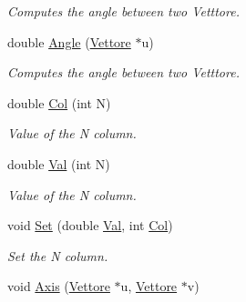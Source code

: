 \begin{DoxyCompactItemize}
\begin{DoxyCompactList}\small\item\em Computes the angle between two Vetttore. \end{DoxyCompactList}\item 
double \hyperlink{classVettore_ac72b0f82d368ace2ef8090d276a9c751}{Angle} (\hyperlink{classVettore}{Vettore} $\ast$u)\hypertarget{classVettore_ac72b0f82d368ace2ef8090d276a9c751}{}\label{classVettore_ac72b0f82d368ace2ef8090d276a9c751}

\begin{DoxyCompactList}\small\item\em Computes the angle between two Vetttore. \end{DoxyCompactList}\item 
double \hyperlink{classVettore_ad018d767a0e0b15fbc17269db64d7574}{Col} (int N)\hypertarget{classVettore_ad018d767a0e0b15fbc17269db64d7574}{}\label{classVettore_ad018d767a0e0b15fbc17269db64d7574}

\begin{DoxyCompactList}\small\item\em Value of the N column. \end{DoxyCompactList}\item 
double \hyperlink{classVettore_a8fcbd69726df0d5309a4f2d790f427fd}{Val} (int N)\hypertarget{classVettore_a8fcbd69726df0d5309a4f2d790f427fd}{}\label{classVettore_a8fcbd69726df0d5309a4f2d790f427fd}

\begin{DoxyCompactList}\small\item\em Value of the N column. \end{DoxyCompactList}\item 
void \hyperlink{classVettore_af865716b201375aaca7c880377aa2426}{Set} (double \hyperlink{classVettore_a8fcbd69726df0d5309a4f2d790f427fd}{Val}, int \hyperlink{classVettore_ad018d767a0e0b15fbc17269db64d7574}{Col})\hypertarget{classVettore_af865716b201375aaca7c880377aa2426}{}\label{classVettore_af865716b201375aaca7c880377aa2426}

\begin{DoxyCompactList}\small\item\em Set the N column. \end{DoxyCompactList}\item 
void \hyperlink{classVettore_a5a767accac3ff301f062fce739190bb8}{Axis} (\hyperlink{classVettore}{Vettore} $\ast$u, \hyperlink{classVettore}{Vettore} $\ast$v)\hypertarget{classVettore_a5a767accac3ff301f062fce739190bb8}{}\label{classVettore_a5a767accac3ff301f062fce739190bb8}


\end{DoxyCompactItemize}
